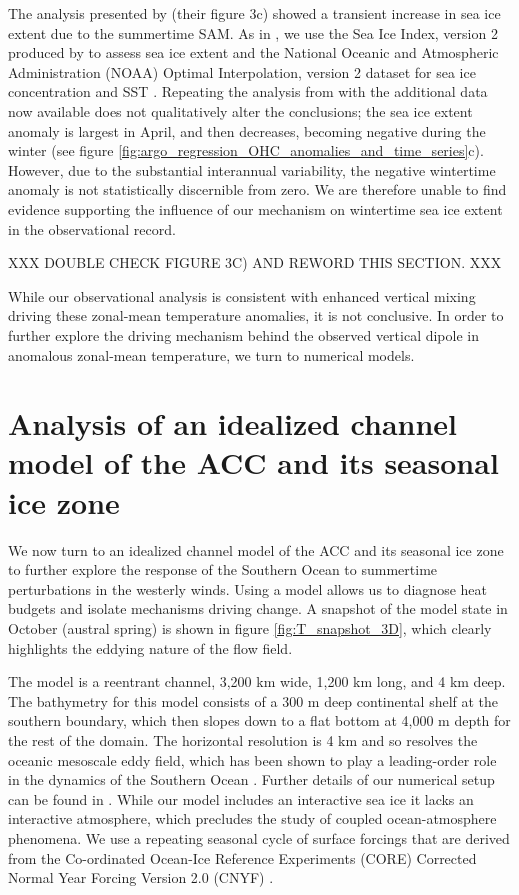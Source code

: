 \documentclass{ametsocV5}
\begin{document}
The analysis presented by \citet{Doddridge2017} (their figure 3c) showed a transient increase in sea ice extent due to the summertime SAM. As in \citet{Doddridge2017}, we use the Sea Ice Index, version 2 produced by \citet{Fetterer2016} to assess sea ice extent and the National Oceanic and Atmospheric Administration (NOAA) Optimal Interpolation, version 2 dataset for sea ice concentration and SST \citep{Reynolds2002}. Repeating the analysis from \citet{Doddridge2017} with the additional data now available does not qualitatively alter the conclusions; the sea ice extent anomaly is largest in April, and then decreases, becoming negative during the winter (see figure \ref{fig:argo_regression_OHC_anomalies_and_time_series}c). However, due to the substantial interannual variability, the negative wintertime anomaly is not statistically discernible from zero. We are therefore unable to find evidence supporting the influence of our mechanism on wintertime sea ice extent in the observational record.

XXX DOUBLE CHECK FIGURE 3C) AND REWORD THIS SECTION. XXX

While our observational analysis is consistent with enhanced vertical mixing driving these zonal-mean temperature anomalies, it is not conclusive. In order to further explore the driving mechanism behind the observed vertical dipole in anomalous zonal-mean temperature, we turn to numerical models.




\section{Analysis of an idealized channel model of the ACC and its seasonal ice zone} %
\label{sec:analysis_of_an_idealised_channel_model}

We now turn to an idealized channel model of the ACC and its seasonal ice zone to further explore the response of the Southern Ocean to summertime perturbations in the westerly winds. Using a model allows us to diagnose heat budgets and isolate mechanisms driving change.  A snapshot of the model state in October (austral spring) is shown in figure \ref{fig:T_snapshot_3D}, which clearly highlights the eddying nature of the flow field.

The model is a reentrant channel, 3,200 km wide, 1,200 km long, and 4 km deep. The bathymetry for this model consists of a 300 m deep continental shelf at the southern boundary, which then slopes down to a flat bottom at 4,000 m depth for the rest of the domain. The horizontal resolution is 4 km and so resolves the oceanic mesoscale eddy field, which has been shown to play a leading-order role in the dynamics of the Southern Ocean \citep[see e.g.][]{Marshall2003,Marshall2012b,Munday2013}. Further details of our numerical setup can be found in \citet{Doddridge2019a}. While our model includes an interactive sea ice \citep{Losch2010} it lacks an interactive atmosphere, which precludes the study of coupled ocean-atmosphere phenomena. We use a repeating seasonal cycle of surface forcings that are derived from the Co-ordinated Ocean-Ice Reference Experiments (CORE) Corrected Normal Year Forcing Version 2.0 (CNYF) \citep{Large2004}.
\end{document}
